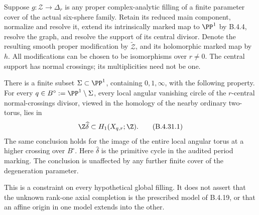 \begin{proposition}\label{push:src:B.4.31}
Suppose $g:\mathcal Z\to\Delta_r$ is any proper complex-analytic
filling of a finite parameter cover of the actual six-sphere
family. Retain its reduced main component, normalize and resolve
it, extend its intrinsically marked map to $\PP^1$ by B.4.4,
resolve the graph, and resolve the support of its central divisor. Denote
the resulting smooth proper modification by $\widetilde{\mathcal Z}$,
and its holomorphic marked map by $h$. All modifications can be
chosen to be isomorphisms over $r\ne0$. The central support has
normal crossings; its multiplicities need not be one.

There is a finite subset $\Sigma\subset\PP^1$, containing
$0,1,\infty$, with the following property. For every
$q\in B^\circ:=\PP^1\setminus\Sigma$, every local angular
vanishing circle of the $r$-central normal-crossings divisor,
viewed in the homology of the nearby ordinary two-torus, lies in
\[
             \Z\widehat\delta\subset H_1(X_{q,r};\Z).
 \tag{B.4.31.1}
\]
The same conclusion holds for the image of the entire local
angular torus at a higher crossing over $B^\circ$.
Here $\widehat\delta$ is the primitive cycle in the audited
period marking. The conclusion is unaffected by any further
finite cover of the degeneration parameter.

This is a constraint on every hypothetical global filling. It
does not assert that the unknown rank-one axial completion is
the prescribed model of B.4.19, or that an affine origin in one
model extends into the other.
\end{proposition}

